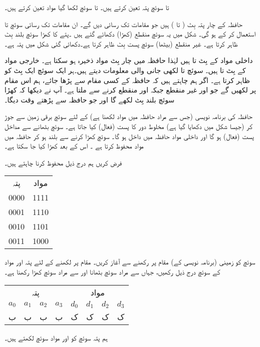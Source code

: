  تا  سوئچ پتہ تعین کرتے ہیں۔  تا  سوئچ لکھا  گیا مواد تعین کرتے ہیں۔

 حافظہ کے چار پتہ بِٹ (  تا  )  ہیں  جو  مقامات تک رسائی  دیں گے۔ ان مقامات تک رسائی  سوئچ  تا  استعمال کر کے ہو گی۔   شکل    میں یہ سوئچ  منقطع    (کھڑا)  دکھائے گئے ہیں ۔پتے     کا  کھڑا سوئچ  بلند  بِٹ  ظاہر کرتا ہے۔  غیر منقطع (بیٹھا) سوئچ پست بِٹ    ظاہر کرتا ہے۔دکھائی گئی شکل میں پتہ  ہے۔
 
 داخلی  مواد کے   بِٹ  تا  ہیں لہٰذا  حافظہ میں چار بِٹ مواد ذخیرہ ہو سکتا ہے۔ خارجی مواد  کے بِٹ  تا  ہیں۔   سوئچ  تا  لکھی   جانی والی معلومات  دیتے ہیں۔ہر ایک سوئچ ایک بِٹ کو ظاہر کرتا ہے۔ اگر ہم  چاہتے ہیں کہ حافظہ کے  کسی مقام سے   پڑھا جائے، ہم اس مقام پر  لکھیں گے جو    اور    غیر منقطع جبکہ  اور   منقطع کرنے سے ملتا ہے۔ آپ نے دیکھا کہ کھڑا سوئچ بلند بِٹ  لکھے گا اور جو  حافظہ سے پڑھتے وقت  دیگا۔

حافظہ کی  برنامہ نویسی   (جس سے مراد حافظہ میں  مواد لکھنا ہے) کے لئے    سوئچ برقی زمین سے جوڑ کر (جیسا شکل میں دکھایا گیا ہے) مخلوط دور کا    پست (فعال)  کیا جاتا ہے۔ سوئچ  بٹھانے   سے  مداخل پست (فعال) ہو  گا اور  داخلی مواد  حافظہ میں داخل ہو گا۔ سوئچ   کھڑا کرنے سے   بلند ہو  کر حافظہ میں مواد  محفوظ  کرتا ہے ۔   اس کے بعد  کھڑا کیا جا سکتا ہے۔

فرض کریں ہم درج ذیل محفوظ کرنا چاہتے ہیں۔
\begin{center}
\begin{tabular}{cc}
پتہ&مواد\\[0.5ex]
0000&1111\\
0001&1110\\
0010&1101\\
0011&1000
\end{tabular}
\end{center}

سوئچ    کو زمینی (برنامہ نویسی کے) مقام  پر رکھنے سے آغاز کریں۔ مقام  پر   لکھنے کے لئے پتہ اور مواد کے سوئچ درج ذیل رکھیں، جہاں   سے مراد سوئچ بٹھانا اور  سے مراد سوئچ کھڑا رکھنا ہے۔
\begin{center}
\begin{tabular}{cccc|cccc}
\multicolumn{4}{c|}{پتہ}&\multicolumn{4}{c}{مواد}\\
$a_0$&$a_1$&$a_2$&$a_3$&$d_0$&$d_1$&$d_2$&$d_3$\\
\toprule
ب&ب&ب&ب&ک&ک&ک&ک
\end{tabular}
\end{center}
ہم پتہ سوئچ کو  اور مواد سوئچ  لکھتے ہیں۔

